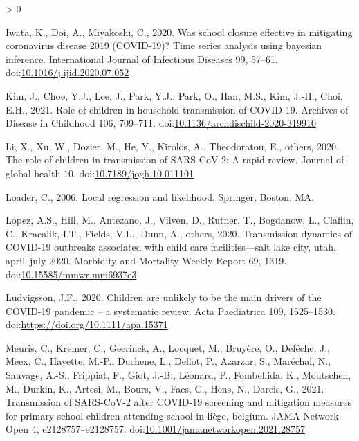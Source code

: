 \documentclass[]{elsarticle} %
\newlength{\cslhangindent}
\newenvironment{CSLReferences}[2] %
 {%
  \setlength{\parindent}{0pt}
  \ifodd #1 \everypar{\setlength{\hangindent}{\cslhangindent}}\ignorespaces\fi
  \ifnum #2 > 0
  \setlength{\parskip}{#2\baselineskip}
  \fi
 }%
 {}
\begin{document}
\begin{CSLReferences}{1}{0}
\leavevmode\hypertarget{ref-iwata2020school}{}%
Iwata, K., Doi, A., Miyakoshi, C., 2020. Was school closure effective in mitigating coronavirus disease 2019 (COVID-19)? Time series analysis using bayesian inference. International Journal of Infectious Diseases 99, 57--61. doi:\href{https://doi.org/10.1016/j.ijid.2020.07.052}{10.1016/j.ijid.2020.07.052}

\leavevmode\hypertarget{ref-kim2021role}{}%
Kim, J., Choe, Y.J., Lee, J., Park, Y.J., Park, O., Han, M.S., Kim, J.-H., Choi, E.H., 2021. Role of children in household transmission of COVID-19. Archives of Disease in Childhood 106, 709--711. doi:\href{https://doi.org/10.1136/archdischild-2020-319910}{10.1136/archdischild-2020-319910}

\leavevmode\hypertarget{ref-li2020role}{}%
Li, X., Xu, W., Dozier, M., He, Y., Kirolos, A., Theodoratou, E., others, 2020. The role of children in transmission of SARS-CoV-2: A rapid review. Journal of global health 10. doi:\href{https://doi.org/10.7189/jogh.10.011101}{10.7189/jogh.10.011101}

\leavevmode\hypertarget{ref-loader2006local}{}%
Loader, C., 2006. Local regression and likelihood. Springer, Boston, MA.

\leavevmode\hypertarget{ref-lopez2020transmission}{}%
Lopez, A.S., Hill, M., Antezano, J., Vilven, D., Rutner, T., Bogdanow, L., Claflin, C., Kracalik, I.T., Fields, V.L., Dunn, A., others, 2020. Transmission dynamics of COVID-19 outbreaks associated with child care facilities---salt lake city, utah, april--july 2020. Morbidity and Mortality Weekly Report 69, 1319. doi:\href{https://doi.org/10.15585/mmwr.mm6937e3}{10.15585/mmwr.mm6937e3}

\leavevmode\hypertarget{ref-ludvigsson2020children}{}%
Ludvigsson, J.F., 2020. Children are unlikely to be the main drivers of the COVID-19 pandemic -- a systematic review. Acta Paediatrica 109, 1525--1530. doi:\url{https://doi.org/10.1111/apa.15371}

\leavevmode\hypertarget{ref-meuris2021transmission}{}%
Meuris, C., Kremer, C., Geerinck, A., Locquet, M., Bruyère, O., Defêche, J., Meex, C., Hayette, M.-P., Duchene, L., Dellot, P., Azarzar, S., Maréchal, N., Sauvage, A.-S., Frippiat, F., Giot, J.-B., Léonard, P., Fombellida, K., Moutschen, M., Durkin, K., Artesi, M., Bours, V., Faes, C., Hens, N., Darcis, G., 2021. Transmission of SARS-CoV-2 after COVID-19 screening and mitigation measures for primary school children attending school in liège, belgium. JAMA Network Open 4, e2128757--e2128757. doi:\href{https://doi.org/10.1001/jamanetworkopen.2021.28757}{10.1001/jamanetworkopen.2021.28757}


\end{CSLReferences}
\end{document}
